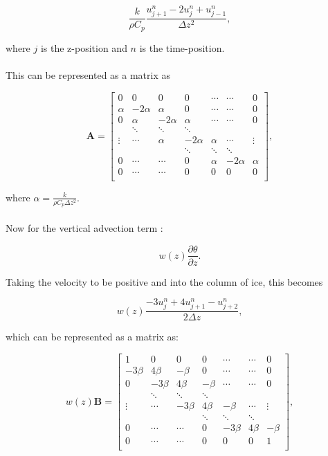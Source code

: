 \documentclass{article}%
\begin{document}
$$\frac{k}{\rho C_p} \frac{u_{j+1}^n - 2u_j^n + u_{j-1}^n}{\Delta z^2},$$

where $j$ is the z-position and $n$ is the time-position.\\
\\
\noindent This can be represented as a matrix as

$$\mathbf{A} = 
\begin{bmatrix}
  0 &0 &0 &0 &\cdots &\cdots &0 \\
  \alpha &-2\alpha &\alpha &0 &\cdots &\cdots &0 \\
  0 &\alpha &-2\alpha &\alpha & \cdots &\cdots &0 \\
  &\ddots & \ddots &\ddots  & & & \\
  \vdots &\cdots &\alpha &-2\alpha &\alpha  &\cdots &\vdots \\
  & & &\ddots &\ddots &\ddots &\\
  0 & \cdots &\cdots &0 &\alpha &-2\alpha &\alpha \\
  0 & \cdots &\cdots &0 &0 &0 &0 \\
\end{bmatrix},$$

where $\alpha = \frac{k}{\rho C_p \Delta z^2}$.\\
\\
\noindent Now for the vertical advection term :

$$w(z)\frac {\partial \theta}{\partial z}.$$

\noindent Taking the velocity to be positive and into the column of ice, this becomes

$$w(z)\frac{-3u_{j}^n + 4u_{j+1}^n - u_{j+2}^n}{2\Delta z},$$

which can be represented as a matrix as:

$$w(z)\mathbf{B} = 
\begin{bmatrix}
  1 &0 &0 &0 &\cdots &\cdots &0 \\
  -3\beta &4\beta &-\beta &0 &\cdots &\cdots &0 \\
  0 &-3\beta &4\beta &-\beta & \cdots &\cdots &0 \\
  &\ddots & \ddots &\ddots  & & & \\
  \vdots &\cdots &-3\beta &4\beta &-\beta  &\cdots &\vdots \\
  & & &\ddots &\ddots &\ddots &\\
  0 & \cdots &\cdots &0 &-3\beta &4\beta &-\beta \\
  0 & \cdots &\cdots &0 &0 &0 &1 \\
\end{bmatrix},$$
\end{document}
